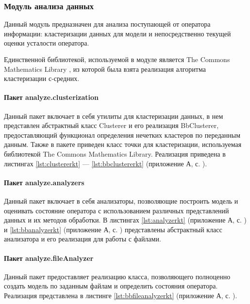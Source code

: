 \subsubsection{Модуль анализа данных}
Данный модуль предназначен для анализа поступающей от оператора \newline информации: кластеризации данных для модели и непосредственно текущей оценки усталости оператора.

Единственной библиотекой, используемой в модуле является \foreignlanguage{english}{The Commons Mathematics Library} \cite{apachemath3}, из которой была взята реализация алгоритма кластеризации с-средних.

\paragraph{Пакет analyze.clusterization \newline}

Данный пакет включает в себя утилиты для кластеризации данных, в нем представлен абстрактный класс Clusterer и его реализация BbClusterer, предоставляющий функционал определения нечетких кластеров по переданным \newline данным. Также в пакете приведен класс точки для кластеризации, используемая библиотекой The Commons Mathematics Library. Реализация приведена в листингах \ref{lst:clustererkt} --- \ref{lst:bbclustererkt} (приложение А, с. \pageref{chp:application-a}).

\paragraph{Пакет analyze.analyzers}

Данный пакет включает в себя анализаторы, позволяющие построить модель и оценивать состояние оператора с использованием различных представлений данных и их методов обработки. В листингах \ref{lst:analyzerkt} (приложение А, с. \pageref{chp:application-a}) и \ref{lst:bbanalyzerkt} (приложение А, с. \pageref{chp:application-a}) представлены абстрактный класс анализатора и его реализация для работы с файлами.

\paragraph{Пакет analyze.fileAnalyzer}
Данный пакет предоставляет реализацию класса, позволяющего полноценно создать модель по заданным файлам и определить состояния оператора. Реализация представлена в листинге \ref{lst:bbfileanalyzerkt} (приложение А, с. \pageref{chp:application-a}).

